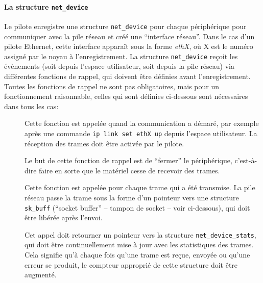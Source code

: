 \documentclass[a4paper,12pt,BCOR6mm,bibtotoc,idxtotoc]{scrbook}
\begin{document}
\paragraph{La structure \lstinline+net_device+} Le
pilote enregistre une structure \lstinline+net_device+ pour chaque
p\'eriph\'erique pour communiquer avec la pile r\'eseau et cr\'e\'e
une ``interface r\'eseau''.  Dans le cas d'un pilote Ethernet, cette
interface appara\^it sous la forme \textit{ethX}, o\`u X est le
num\'ero assign\'e par le noyau \`a l'enregistrement. La structure
\lstinline+net_device+ re\c{c}oit les \'ev\`enements (soit depuis
l'espace utilisateur, soit depuis la pile r\'eseau) via diff\'erentes
fonctions de rappel, qui doivent \^etre d\'efinies avant
l'enregistrement.  Toutes les fonctions de rappel ne sont pas
obligatoires, mais pour un fonctionnement raisonnable, celles qui sont
d\'efinies ci-dessous sont n\'ecessaires dans tous les cas:

\newsavebox\boxopen
\sbox{}
\newsavebox\boxstop
\sbox{}
\newsavebox\boxxmit
\sbox{}
\newsavebox\boxstats
\sbox{}

\begin{description}

\item[\usebox\boxopen] Cette fonction est appel\'ee quand la
  communication a d\'emar\'e, par exemple apr\`es une commande
  \lstinline+ip link set ethX up+ depuis l'espace utilisateur. La
  r\'eception des trames doit \^etre activ\'ee par le pilote.

\item[\usebox\boxstop] Le but de cette fonction de rappel est de
  ``fermer'' le p\'eriph\'erique, c'est-\`a-dire faire en sorte que le
  mat\'eriel cesse de recevoir des trames.

\item[\usebox\boxxmit] Cette fonction est appel\'ee pour chaque trame
  qui a \'et\'e transmise.  La pile r\'eseau passe la trame sous la
  forme d'un pointeur vers une structure \lstinline+sk_buff+ (``socket
  buffer'' -- tampon de socket -- voir ci-dessous),
  qui doit \^etre lib\'er\'ee apr\`es l'envoi.

\item[\usebox\boxstats] Cet appel doit retourner un pointeur vers la
  structure \lstinline+net_device_stats+, qui doit \^etre
  continuellement mise \`a jour avec les statistiques des trames. Cela
  signifie qu'\`a chaque fois qu'une trame est re\c{c}ue, envoy\'ee ou
  qu'une erreur se produit, le compteur appropri\'e de cette structure
  doit \^etre augment\'e.

\end{description}
\end{document}
